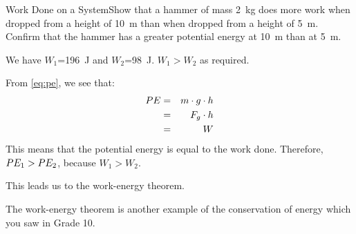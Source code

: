 \begin{wex}{Work Done on a System}{Show that a hammer of mass 2~kg does more work when dropped from a height of 10~m than when dropped from a height of 5~m. Confirm that the hammer has a greater potential energy at 10~m than at 5~m.}
{
We have $W_1$=196~J and $W_2$=98~J. $W_1>W_2$ as required.

From \ref{eq:pe}, we see that:
\begin{eqnarray*}
PE&=&m\cdot g \cdot h\\
&=&F_g \cdot h\\
&=&W
\end{eqnarray*}
This means that the potential energy is equal to the work done. Therefore, $PE_1>PE_2$, because $W_1>W_2$.
}
\end{wex}

This leads us to the work-energy theorem.


The work-energy theorem is another example of the conservation of energy which you saw in Grade 10. 

